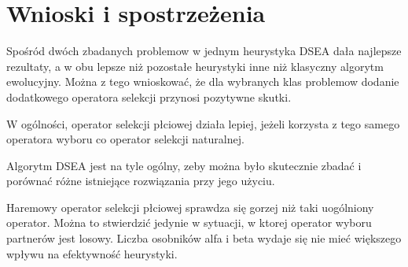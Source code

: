 \documentclass[./FM_mgr.tex]{subfiles}
\begin{document}
\chapter{Wnioski i spostrzeżenia}

Spośród dwóch zbadanych problemow w jednym heurystyka DSEA dała najlepsze rezultaty, a w obu lepsze niż pozostałe heurystyki inne niż klasyczny algorytm ewolucyjny.
Można z tego wnioskować, że dla wybranych klas problemow dodanie dodatkowego operatora selekcji przynosi pozytywne skutki.

W ogólności, operator selekcji płciowej działa lepiej, jeżeli korzysta z tego samego operatora wyboru co operator selekcji naturalnej.

Algorytm DSEA jest na tyle ogólny, zeby można było skutecznie zbadać i porównać różne istniejące rozwiązania przy jego użyciu.

Haremowy operator selekcji płciowej sprawdza się gorzej niż taki uogólniony operator.
Można to stwierdzić jedynie w sytuacji, w ktorej operator wyboru partnerów jest losowy.
Liczba osobników alfa i beta wydaje się nie mieć większego wpływu na efektywność heurystyki.
\end{document}
